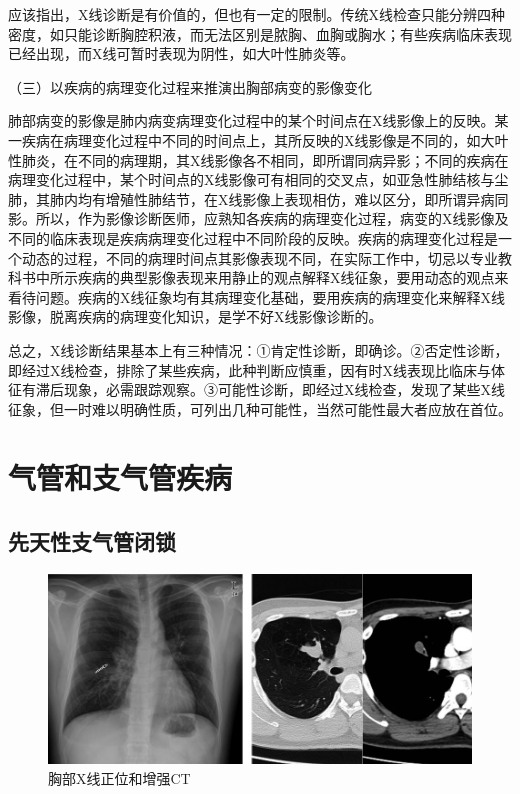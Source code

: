 应该指出，X线诊断是有价值的，但也有一定的限制。传统X线检查只能分辨四种密度，如只能诊断胸腔积液，而无法区别是脓胸、血胸或胸水；有些疾病临床表现已经出现，而X线可暂时表现为阴性，如大叶性肺炎等。

（三）以疾病的病理变化过程来推演出胸部病变的影像变化

肺部病变的影像是肺内病变病理变化过程中的某个时间点在X线影像上的反映。某一疾病在病理变化过程中不同的时间点上，其所反映的X线影像是不同的，如大叶性肺炎，在不同的病理期，其X线影像各不相同，即所谓同病异影；不同的疾病在病理变化过程中，某个时间点的X线影像可有相同的交叉点，如亚急性肺结核与尘肺，其肺内均有增殖性肺结节，在X线影像上表现相仿，难以区分，即所谓异病同影。所以，作为影像诊断医师，应熟知各疾病的病理变化过程，病变的X线影像及不同的临床表现是疾病病理变化过程中不同阶段的反映。疾病的病理变化过程是一个动态的过程，不同的病理时间点其影像表现不同，在实际工作中，切忌以专业教科书中所示疾病的典型影像表现来用静止的观点解释X线征象，要用动态的观点来看待问题。疾病的X线征象均有其病理变化基础，要用疾病的病理变化来解释X线影像，脱离疾病的病理变化知识，是学不好X线影像诊断的。

总之，X线诊断结果基本上有三种情况：①肯定性诊断，即确诊。②否定性诊断，即经过X线检查，排除了某些疾病，此种判断应慎重，因有时X线表现比临床与体征有滞后现象，必需跟踪观察。③可能性诊断，即经过X线检查，发现了某些X线征象，但一时难以明确性质，可列出几种可能性，当然可能性最大者应放在首位。

\section{气管和支气管疾病}

\subsection{先天性支气管闭锁}

\begin{figure}[!htbp]
 \centering
 \includegraphics{./images/Image00137.jpg}
 \captionsetup{justification=centering}
 \caption{胸部X线正位和增强CT}
 \label{fig3-2-1}
  \end{figure} 

